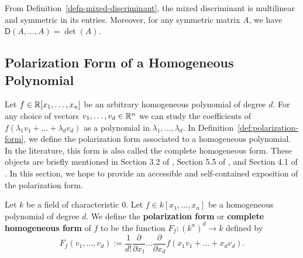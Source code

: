 \documentclass{puthesis-UG}
\begin{document}
From Definition~\ref{defn-mixed-discriminant}, the mixed discriminant is multilinear and symmetric in its entries. Moreover, for any symmetric matrix $A$, we have $\mathsf{D}(A, \ldots, A) = \det (A)$. 

\subsection{Polarization Form of a Homogeneous Polynomial} \label{sec:polarization-form}

Let $f \in \mathbb{R}[x_1, \ldots, x_n]$ be an arbitrary homogeneous polynomial of degree $d$. For any choice of vectors $v_1, \ldots, v_d \in \mathbb{R}^n$ we can study the coefficients of $f(\lambda_1 v_1 + \ldots + \lambda_d v_d)$ as a polynomial in $\lambda_1, \ldots, \lambda_d$. In Definition~\ref{def:polarization-form}, we define the polarization form associated to a homogeneous polynomial. In the literature, this form is also called the complete homogeneous form. These objects are briefly mentioned in Section 3.2 of \cite{lie-groups}, Section 5.5 of \cite{schneider_2013}, and Section 4.1 of \cite{lorentzian-polynomials}. In this section, we hope to provide an accessible and self-contained exposition of the polarization form.

\begin{defn} \label{def:polarization-form}
	Let $k$ be a field of characteristic $0$. Let $f \in k[x_1, \ldots, x_n]$ be a homogeneous polynomial of degree $d$. We define the \textbf{polarization form} or \textbf{complete homogeneous form} of $f$ to be the function $F_f : (k^n)^d \to k$ defined by 
	\[
		F_f (v_1, \ldots, v_d) := \frac{1}{d!} \frac{\partial}{\partial x_1} \ldots \frac{\partial}{\partial x_d} f(x_1 v_1 + \ldots + x_d v_d).
	\] 
\end{defn}
\end{document}
